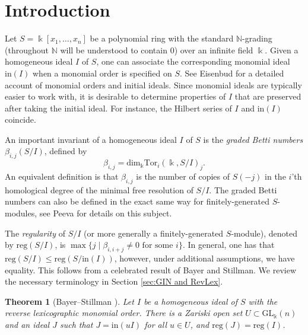 \documentclass[a4paper, 10pt, reqno, english, ones]{amsart}  %
\makeatletter
\newtheorem{theorem}{Theorem}[section]
\theoremstyle{definition}
\theoremstyle{remark}
\def\keywords{\xdef\@thefnmark{}\@footnotetext}
\makeatother
\begin{document}
\maketitle


\setcounter{tocdepth}{1}





\section{Introduction}

Let $S=\Bbbk [x_1,\dots,x_n]$ be a polynomial ring with the standard $\mathbb{N}$-grading (throughout $\mathbb{N}$ will be understood to contain $0$) over an infinite field $\Bbbk$. Given a homogeneous ideal $I$ of $S$, one can associate the corresponding monomial ideal $\textrm{in}(I)$ when a monomial order is specified on $S$. See  Eisenbud \cite[Chapter 15]{eisenbudBook} for a detailed account of monomial orders and initial ideals. Since monomial ideals are typically easier to work with, it is desirable to determine properties of $I$ that are preserved after taking the initial ideal. For instance, the Hilbert series of $I$ and $\textrm{in}(I)$ coincide.

An important invariant of a homogeneous ideal $I$ of $S$ is the \textit{graded Betti numbers} $\beta_{i,j}(S/I)$, defined by 
\[
\beta_{i,j} = \textrm{dim}_\Bbbk\textrm{Tor}_i(\Bbbk ,S/I)_j.
\]
An equivalent definition is that $\beta_{i,j}$ is the number of copies of $S(-j)$ in the $i$'th homological degree of the minimal free resolution of $S/I$. The graded Betti numbers can also be defined in the exact same way for finitely-generated $S$-modules, see Peeva \cite{PeevaBook} for details on this subject.

The \textit{regularity} of $S/I$ (or more generally a finitely-generated $S$-module), denoted by $\textrm{reg}(S/I)$, is $\max\{j \mid \beta_{i,i+j} \neq 0 \textrm{ for some }i\}$. In general, one has that $\textrm{reg}(S/I)\leq \textrm{reg}(S/\textrm{in}(I))$, however, under additional assumptions, we have equality. This follows from a celebrated result of Bayer and Stillman. We review the necessary terminology in Section \ref{sec:GIN and RevLex}.

\begin{theorem}[Bayer--Stillman \cite{Bayer1987Criterion}]\label{thm:BayerStillman}
    Let $I$ be a homogeneous ideal of $S$ with the reverse lexicographic monomial order. There is a Zariski open set $U\subset \textrm{GL}_{\Bbbk }(n)$ and an ideal $J$ such that $J=\textrm{in}(uI)$ for all $u\in U$, and $\textrm{reg}(J) = \textrm{reg}(I)$.
\end{theorem}
\end{document}
